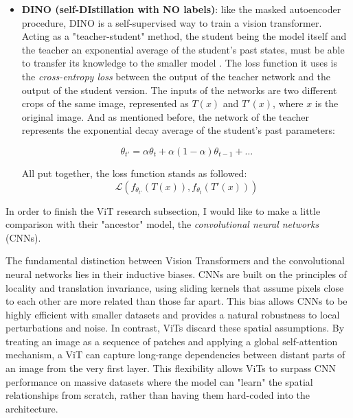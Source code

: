 \begin{itemize}
	\item \textbf{DINO (self-DIstillation with NO labels)}: like the masked autoencoder procedure, DINO is a self-supervised way to train a vision transformer. Acting as a "teacher-student" method, the student being the model itself and the teacher an exponential average of the student's past states, must be able to transfer its knowledge to the smaller model \cite{wiki:knowledge_distillation}. The loss function it uses is the \textit{cross-entropy loss} between the output of the teacher network and the output of the student version. The inputs of the networks are two different crops of the same image, represented as $T(x)$ and $T'(x)$, where $x$ is the original image. And as mentioned before, the network of the teacher represents the exponential decay average of the student's past parameters: 
	
	\begin{equation}
		\theta_{t'} = \alpha \theta_t + \alpha(1 - \alpha) \theta_{t-1} + \dots
	\end{equation}
	
	All put together, the loss function stands as followed:
	\begin{equation}
		\mathcal{L}(f_{\theta_{t'}}(T(x)), f_{\theta_{t}}(T'(x)))
	\end{equation}	
\end{itemize}

In order to finish the ViT research subsection, I would like to make a little comparison with their "ancestor" model, the \textit{convolutional neural networks} (CNNs).

The fundamental distinction between Vision Transformers and the convolutional neural networks lies in their inductive biases. CNNs are built on the principles of locality and translation invariance, using sliding kernels that assume pixels close to each other are more related than those far apart. This bias allows CNNs to be highly efficient with smaller datasets and provides a natural robustness to local perturbations and noise. In contrast, ViTs discard these spatial assumptions. By treating an image as a sequence of patches and applying a global self-attention mechanism, a ViT can capture long-range dependencies between distant parts of an image from the very first layer. This flexibility allows ViTs to surpass CNN performance on massive datasets where the model can "learn" the spatial relationships from scratch, rather than having them hard-coded into the architecture.

